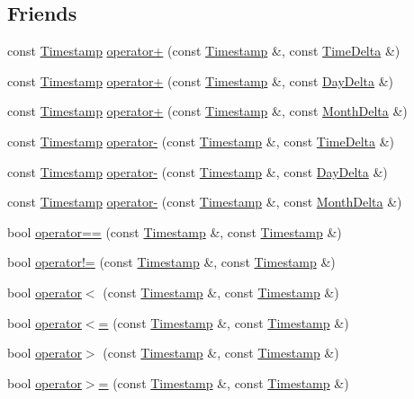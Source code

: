 \subsection*{\-Friends}
\begin{DoxyCompactItemize}
\item 
const \hyperlink{structTimestamp}{\-Timestamp} \hyperlink{structTimestamp_a8622c9fbc95503094242df532259ba73}{operator+} (const \hyperlink{structTimestamp}{\-Timestamp} \&, const \hyperlink{structTimeDelta}{\-Time\-Delta} \&)
\item 
const \hyperlink{structTimestamp}{\-Timestamp} \hyperlink{structTimestamp_a12914a9334d2aeb8c576a974ee94a563}{operator+} (const \hyperlink{structTimestamp}{\-Timestamp} \&, const \hyperlink{structDayDelta}{\-Day\-Delta} \&)
\item 
const \hyperlink{structTimestamp}{\-Timestamp} \hyperlink{structTimestamp_ad4056edc13e40fe6da6e9e9f20130e53}{operator+} (const \hyperlink{structTimestamp}{\-Timestamp} \&, const \hyperlink{structMonthDelta}{\-Month\-Delta} \&)
\item 
const \hyperlink{structTimestamp}{\-Timestamp} \hyperlink{structTimestamp_add156da05729dc1fd13f6b609be8d074}{operator-\/} (const \hyperlink{structTimestamp}{\-Timestamp} \&, const \hyperlink{structTimeDelta}{\-Time\-Delta} \&)
\item 
const \hyperlink{structTimestamp}{\-Timestamp} \hyperlink{structTimestamp_af865c1b30e65b8b9343ece8f1aebb3c1}{operator-\/} (const \hyperlink{structTimestamp}{\-Timestamp} \&, const \hyperlink{structDayDelta}{\-Day\-Delta} \&)
\item 
const \hyperlink{structTimestamp}{\-Timestamp} \hyperlink{structTimestamp_a980eb48a31b4b11777ba12f19a3fd05d}{operator-\/} (const \hyperlink{structTimestamp}{\-Timestamp} \&, const \hyperlink{structMonthDelta}{\-Month\-Delta} \&)
\item 
bool \hyperlink{structTimestamp_a03ee0f95cabeda6ba264c450b2d5e865}{operator==} (const \hyperlink{structTimestamp}{\-Timestamp} \&, const \hyperlink{structTimestamp}{\-Timestamp} \&)
\item 
bool \hyperlink{structTimestamp_aba70b6de92d74255657051a9f2cc5eec}{operator!=} (const \hyperlink{structTimestamp}{\-Timestamp} \&, const \hyperlink{structTimestamp}{\-Timestamp} \&)
\item 
bool \hyperlink{structTimestamp_a2ab21f9eec9e20f35c6b45c04985db38}{operator$<$} (const \hyperlink{structTimestamp}{\-Timestamp} \&, const \hyperlink{structTimestamp}{\-Timestamp} \&)
\item 
bool \hyperlink{structTimestamp_a5600751cebbd130559fa485a7d7932d7}{operator$<$=} (const \hyperlink{structTimestamp}{\-Timestamp} \&, const \hyperlink{structTimestamp}{\-Timestamp} \&)
\item 
bool \hyperlink{structTimestamp_a56506c9ed2c4e96a2740d2f527a2fb22}{operator$>$} (const \hyperlink{structTimestamp}{\-Timestamp} \&, const \hyperlink{structTimestamp}{\-Timestamp} \&)
\item 
bool \hyperlink{structTimestamp_ab53468a00b24c60130785a547517e97b}{operator$>$=} (const \hyperlink{structTimestamp}{\-Timestamp} \&, const \hyperlink{structTimestamp}{\-Timestamp} \&)
\end{DoxyCompactItemize}



